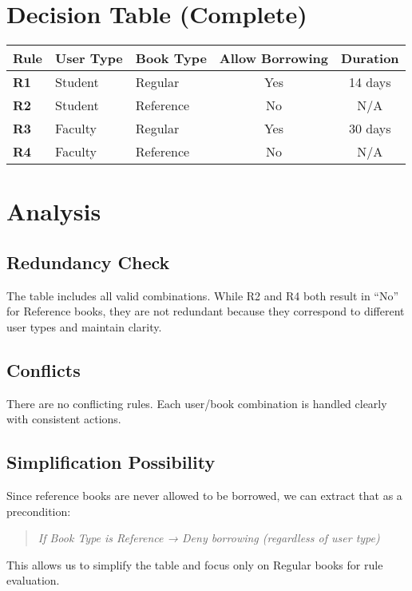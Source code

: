 \documentclass[12pt]{article}
\begin{document}
\section{Decision Table (Complete)}

\begin{center}
\begin{tabular}{>{\bfseries}l l l c c}
\toprule
Rule & User Type & Book Type & Allow Borrowing & Duration \\
\midrule
R1 & Student & Regular   & Yes & 14 days \\
R2 & Student & Reference & No  & N/A     \\
R3 & Faculty & Regular   & Yes & 30 days \\
R4 & Faculty & Reference & No  & N/A     \\
\bottomrule
\end{tabular}
\end{center}

\section{Analysis}

\subsection*{Redundancy Check}
The table includes all valid combinations. While R2 and R4 both result in ``No'' for Reference books, they are not redundant because they correspond to different user types and maintain clarity.

\subsection*{Conflicts}
There are no conflicting rules. Each user/book combination is handled clearly with consistent actions.

\subsection*{Simplification Possibility}
Since reference books are never allowed to be borrowed, we can extract that as a precondition:

\begin{quote}
\textit{If Book Type is Reference → Deny borrowing (regardless of user type)}
\end{quote}

This allows us to simplify the table and focus only on Regular books for rule evaluation.
\end{document}

